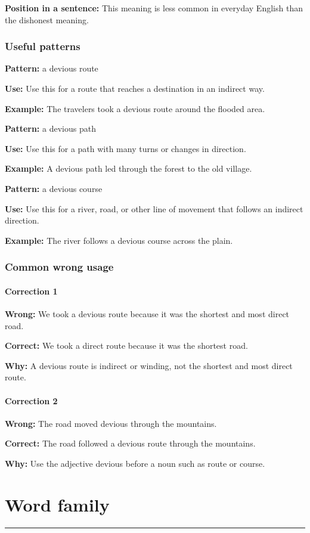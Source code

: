 \documentclass[11pt]{article}
\newcommand{\sectionrule}{\par\vspace{-0.5em}\noindent\textcolor{Accent}{\rule{\linewidth}{0.6pt}}\par}
\begin{document}
\textbf{Position in a sentence:} This meaning is less common in everyday English than the dishonest meaning.

\subsubsection{Useful patterns}
\textbf{Pattern:} a devious route

\textbf{Use:} Use this for a route that reaches a destination in an indirect way.

\textbf{Example:} The travelers took a devious route around the flooded area.

\textbf{Pattern:} a devious path

\textbf{Use:} Use this for a path with many turns or changes in direction.

\textbf{Example:} A devious path led through the forest to the old village.

\textbf{Pattern:} a devious course

\textbf{Use:} Use this for a river, road, or other line of movement that follows an indirect direction.

\textbf{Example:} The river follows a devious course across the plain.

\subsubsection{Common wrong usage}
\paragraph{Correction 1}
\textbf{Wrong:} We took a devious route because it was the shortest and most direct road.

\textbf{Correct:} We took a direct route because it was the shortest road.

\textbf{Why:} A devious route is indirect or winding, not the shortest and most direct route.

\paragraph{Correction 2}
\textbf{Wrong:} The road moved devious through the mountains.

\textbf{Correct:} The road followed a devious route through the mountains.

\textbf{Why:} Use the adjective devious before a noun such as route or course.

\section{Word family}
\sectionrule
\end{document}
